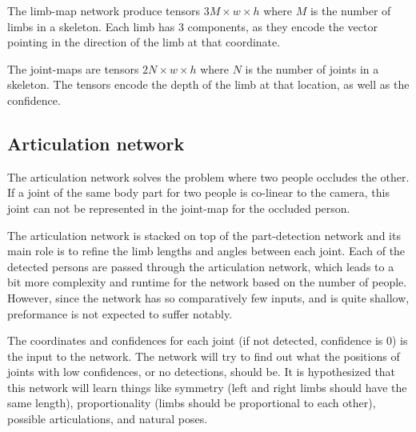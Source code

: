 The limb-map network produce tensors $3M \times w \times h$ where $M$ is the number of limbs in a skeleton. Each limb has 3 components, as they encode the vector pointing in the direction of the limb at that coordinate.

The joint-maps are tensors $2N \times w \times h$ where $N$ is the number of joints in a skeleton. The tensors encode the depth of the limb at that location, as well as the confidence.





\subsection{Articulation network}\label{subsec:articulation}
The articulation network solves the problem where two people occludes the other. If a joint of the same body part for two people is co-linear to the camera, this joint can not be represented in the joint-map for the occluded person.

The articulation network is stacked on top of the part-detection network and its main role is to refine the limb lengths and angles between each joint. Each of the detected persons are passed through the articulation network, which leads to a bit more complexity and runtime for the network based on the number of people. However, since the network has so comparatively few inputs, and is quite shallow, preformance is not expected to suffer notably.

The coordinates and confidences for each joint (if not detected, confidence is 0) is the input to the network. The network will try to find out what the positions of joints with low confidences, or no detections, should be. It is hypothesized that this network will learn things like symmetry (left and right limbs should have the same length), proportionality (limbs should be proportional to each other), possible articulations, and natural poses.


